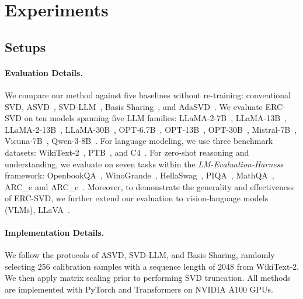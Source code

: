 \section{Experiments} \label{sec:experiments}
\subsection{Setups}

\paragraph{Evaluation Details.} We compare our method against five baselines without re-training: conventional SVD, ASVD~\cite{yuan2023asvd}, SVD-LLM~\cite{wang2024svd}, Basis Sharing~\cite{wang2024basis}, and AdaSVD~\cite{li2025adasvd}. We evaluate ERC-SVD on ten models spanning five LLM families: LLaMA-2-7B~\cite{touvron2023llama2}, LLaMA-13B~\cite{touvron2023llama}, LLaMA-2-13B~\cite{touvron2023llama2}, LLaMA-30B~\cite{touvron2023llama}, OPT-6.7B~\cite{zhang2022opt}, OPT-13B~\cite{zhang2022opt}, OPT-30B~\cite{zhang2022opt}, Mistral-7B~\cite{jiang2023mistral}, Vicuna-7B~\cite{chiang2023vicuna}, Qwen-3-8B~\cite{yang2025qwen3}. 
For language modeling, we use three benchmark datasets: WikiText-2~\cite{merity2016pointer}, PTB~\cite{marcus1993building}, and C4~\cite{raffel2020exploring}.
For zero-shot reasoning and understanding, we evaluate on seven tasks within the \textit{LM-Evaluation-Harness} framework: OpenbookQA~\cite{mihaylov2018can}, WinoGrande~\cite{sakaguchi2021winogrande}, HellaSwag~\cite{zellers2019hellaswag}, PIQA~\cite{bisk2020piqa}, MathQA~\cite{amini2019mathqa}, ARC\_e and ARC\_c~\cite{clark2018think}. Moreover, to demonstrate the generality and effectiveness of ERC-SVD, we further extend our evaluation to vision-language models (VLMs), LLaVA~\cite{liu2024improved}.

\paragraph{Implementation Details.} \label{implementation_details}
We follow the protocols of ASVD, SVD-LLM, and Basis Sharing, randomly selecting 256 calibration samples with a sequence length of 2048 from WikiText-2. We then apply matrix scaling prior to performing SVD truncation. All methods are implemented with PyTorch and Transformers on NVIDIA A100 GPUs. 

